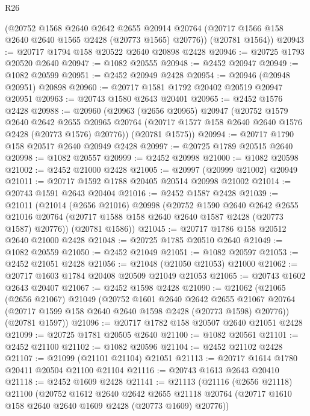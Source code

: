 \begin{lexlean}{R26}
\begin{coremodule}
      (@20752
        @1568
        @2640
        @2642
        @2655
        @20914
        @20764
        (@20717 @1566 @158 @2640 @2640 @1565 @2428 (@20773 @1565) @20776))
      (@20781 @1564))
@20943 := @20717 @1794 @158 @20522 @2640 @20898 @2428
@20946 := @20725 @1793 @20520 @2640
@20947 := @1082 @20555
@20948 := @2452 @20947
@20949 := @1082 @20599
@20951 := @2452 @20949 @2428
@20954 := @20946 (@20948 @20951) @20898
@20960 := @20717 @1581 @1792 @20402 @20519 @20947 @20951
@20963 := @20743 @1580 @2643 @20401
@20965 := @2452 @1576 @2428
@20988 := @20960
    (@20963
      (@2656 @20965)
      @20947
      (@20752
        @1579
        @2640
        @2642
        @2655
        @20965
        @20764
        (@20717 @1577 @158 @2640 @2640 @1576 @2428 (@20773 @1576) @20776))
      (@20781 @1575))
@20994 := @20717 @1790 @158 @20517 @2640 @20949 @2428
@20997 := @20725 @1789 @20515 @2640
@20998 := @1082 @20557
@20999 := @2452 @20998
@21000 := @1082 @20598
@21002 := @2452 @21000 @2428
@21005 := @20997 (@20999 @21002) @20949
@21011 := @20717 @1592 @1788 @20405 @20514 @20998 @21002
@21014 := @20743 @1591 @2643 @20404
@21016 := @2452 @1587 @2428
@21039 := @21011
    (@21014
      (@2656 @21016)
      @20998
      (@20752
        @1590
        @2640
        @2642
        @2655
        @21016
        @20764
        (@20717 @1588 @158 @2640 @2640 @1587 @2428 (@20773 @1587) @20776))
      (@20781 @1586))
@21045 := @20717 @1786 @158 @20512 @2640 @21000 @2428
@21048 := @20725 @1785 @20510 @2640
@21049 := @1082 @20559
@21050 := @2452 @21049
@21051 := @1082 @20597
@21053 := @2452 @21051 @2428
@21056 := @21048 (@21050 @21053) @21000
@21062 := @20717 @1603 @1784 @20408 @20509 @21049 @21053
@21065 := @20743 @1602 @2643 @20407
@21067 := @2452 @1598 @2428
@21090 := @21062
    (@21065
      (@2656 @21067)
      @21049
      (@20752
        @1601
        @2640
        @2642
        @2655
        @21067
        @20764
        (@20717 @1599 @158 @2640 @2640 @1598 @2428 (@20773 @1598) @20776))
      (@20781 @1597))
@21096 := @20717 @1782 @158 @20507 @2640 @21051 @2428
@21099 := @20725 @1781 @20505 @2640
@21100 := @1082 @20561
@21101 := @2452 @21100
@21102 := @1082 @20596
@21104 := @2452 @21102 @2428
@21107 := @21099 (@21101 @21104) @21051
@21113 := @20717 @1614 @1780 @20411 @20504 @21100 @21104
@21116 := @20743 @1613 @2643 @20410
@21118 := @2452 @1609 @2428
@21141 := @21113
    (@21116
      (@2656 @21118)
      @21100
      (@20752
        @1612
        @2640
        @2642
        @2655
        @21118
        @20764
        (@20717 @1610 @158 @2640 @2640 @1609 @2428 (@20773 @1609) @20776))

\end{coremodule}
\end{lexlean}
